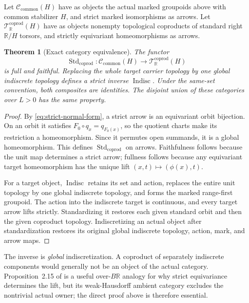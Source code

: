 \documentclass[11pt]{article}
\newtheorem{theorem}{Theorem}[section]
\theoremstyle{definition}
\newcommand{\R}{\mathbb R}
\newcommand{\Std}{\operatorname{Std}_{\mathrm{coprod}}}
\newcommand{\Indisc}{\operatorname{Indisc}}
\begin{document}
Let $\mathcal C_{\mathrm{common}}(H)$ have as objects the actual marked
groupoids above with common stabilizer $H$, and strict marked isomorphisms as
arrows.  Let $\mathcal T_{\R}^{\mathrm{coprod}}(H)$ have as objects nonempty
topological coproducts of standard right $\R/H$ torsors, and strictly
equivariant homeomorphisms as arrows.

\begin{theorem}[Exact category equivalence]
\label{thm:equivalence}
The functor
\begin{equation}
\label{eq:std-functor}
 \Std:\mathcal C_{\mathrm{common}}(H)
 \longrightarrow\mathcal T_{\R}^{\mathrm{coprod}}(H)
\end{equation}
is full and faithful.  Replacing the whole target carrier topology by one
global indiscrete topology defines a strict inverse $\Indisc$.  Under the
same-set convention, both composites are identities.  The disjoint union of
these categories over $L>0$ has the same property.
\end{theorem}

\begin{proof}
By \cref{eq:strict-normal-form}, a strict arrow is an equivariant orbit
bijection.  On an orbit it satisfies $F_0\circ q_x=q_{F_0(x)}$, so the
quotient charts make its restriction a homeomorphism.  Since it permutes
open summands, it is a global homeomorphism.  This defines $\Std$ on arrows.
Faithfulness follows because the unit map determines a strict arrow;
fullness follows because any equivariant target homeomorphism has the unique
lift $(x,t)\mapsto(\phi(x),t)$.

For a target object, $\Indisc$ retains its set and action, replaces the
entire unit topology by one global indiscrete topology, and forms the marked
range-first groupoid.  The action into the indiscrete target is continuous,
and every target arrow lifts strictly.  Standardizing it restores each
given standard orbit and then the given coproduct topology.  Indiscretizing
an actual object after standardization restores its original global
indiscrete topology, action, mark, and arrow maps.
\end{proof}

The inverse is \emph{global} indiscretization.  A coproduct of separately
indiscrete components would generally not be an object of the actual
category.  Proposition~2.15 of \citet{GepnerMeier2023} is a useful over-$B\R$
analogy for why strict equivariance determines the lift, but its
weak-Hausdorff ambient category excludes the nontrivial actual owner; the
direct proof above is therefore essential.
\end{document}
